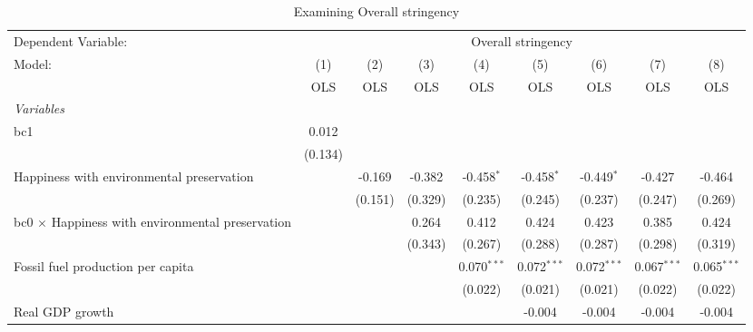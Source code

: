 
\begin{table}[htbp]
   \caption{Examining Overall stringency}
   \centering
   \begin{tabular}{lcccccccc}
      \toprule
      Dependent Variable: & \multicolumn{8}{c}{Overall stringency}\\
      Model:                                                  & (1)     & (2)     & (3)     & (4)           & (5)           & (6)           & (7)           & (8)\\  
                                                              &  OLS    & OLS     & OLS     & OLS           & OLS           & OLS           & OLS           & OLS\\  
      \midrule
      \emph{Variables}\\
      bc1                                                     & 0.012   &         &         &               &               &               &               &   \\   
                                                              & (0.134) &         &         &               &               &               &               &   \\   
      Happiness with environmental preservation               &         & -0.169  & -0.382  & -0.458$^{*}$  & -0.458$^{*}$  & -0.449$^{*}$  & -0.427        & -0.464\\   
                                                              &         & (0.151) & (0.329) & (0.235)       & (0.245)       & (0.237)       & (0.247)       & (0.269)\\   
      bc0 $\times$ Happiness with environmental preservation  &         &         & 0.264   & 0.412         & 0.424         & 0.423         & 0.385         & 0.424\\   
                                                              &         &         & (0.343) & (0.267)       & (0.288)       & (0.287)       & (0.298)       & (0.319)\\   
      Fossil fuel production per capita                       &         &         &         & 0.070$^{***}$ & 0.072$^{***}$ & 0.072$^{***}$ & 0.067$^{***}$ & 0.065$^{***}$\\   
                                                              &         &         &         & (0.022)       & (0.021)       & (0.021)       & (0.022)       & (0.022)\\   
      Real GDP growth                                         &         &         &         &               & -0.004        & -0.004        & -0.004        & -0.004\\   

\end{tabular}
\end{table}
